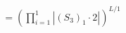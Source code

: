 \documentclass[preview]{standalone}
\begin{document}
\begin{align*}
\quad\\   &= \left(\prod_{i=1}^{1}\left|\left(S_3\right)_{1}\cdot 2\right|\right)^{L/1}
\end{align*}
\end{document}
